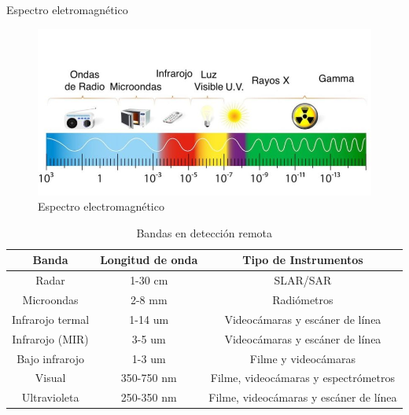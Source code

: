 \begin{frame}{Espectro eletromagnético}
    \begin{figure}
        \centering
        \includegraphics[scale=0.2]{img/section_03/espectro-electromagnetico.jpg}
        \caption{Espectro electromagnético}
        \label{fig:section_03_espectro_electromagnetico}
    \end{figure}
    
    \tiny
    \begin{table}
        \centering
        \begin{tabular}{c|c|c}
            \hline
            Banda & Longitud de onda & Tipo de Instrumentos \\
            \hline
            Radar & 1-30 cm & SLAR/SAR \\
            Microondas & 2-8 mm & Radiómetros \\
            Infrarojo termal & 1-14 um & Videocámaras y escáner de línea \\
            Infrarojo (MIR) & 3-5 um & Videocámaras y escáner de línea \\
            Bajo infrarojo & 1-3 um & Filme y videocámaras \\
            Visual & 350-750 nm & Filme, videocámaras y espectrómetros \\
            Ultravioleta & 250-350 nm & Filme, videocámaras y escáner de línea \\
            \hline
        \end{tabular}
        \caption{Bandas en detección remota}
        \label{tab:bandas_deteccion_remota}
    \end{table}
\end{frame}

